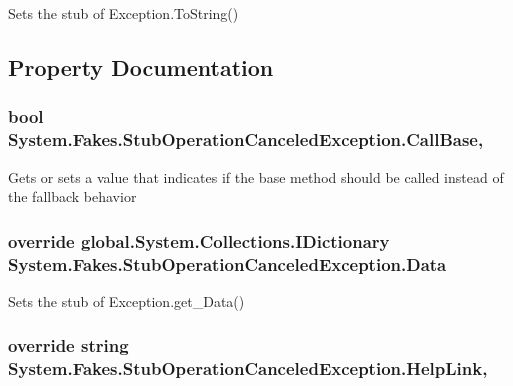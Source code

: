 Sets the stub of Exception.\-To\-String()



\subsection{Property Documentation}
\hypertarget{class_system_1_1_fakes_1_1_stub_operation_canceled_exception_a45fef801671c6864f8eb65a66c1a8fee}{
\subsubsection[{Call\-Base}]{\setlength{\rightskip}{0pt plus 5cm}bool System.\-Fakes.\-Stub\-Operation\-Canceled\-Exception.\-Call\-Base\hspace{0.3cm}{\ttfamily [get]}, {\ttfamily [set]}}}\label{class_system_1_1_fakes_1_1_stub_operation_canceled_exception_a45fef801671c6864f8eb65a66c1a8fee}


Gets or sets a value that indicates if the base method should be called instead of the fallback behavior

\hypertarget{class_system_1_1_fakes_1_1_stub_operation_canceled_exception_ac60eeb4c9ea6f68e30568ce9702715e3}{
\subsubsection[{Data}]{\setlength{\rightskip}{0pt plus 5cm}override global.\-System.\-Collections.\-I\-Dictionary System.\-Fakes.\-Stub\-Operation\-Canceled\-Exception.\-Data\hspace{0.3cm}{\ttfamily [get]}}}\label{class_system_1_1_fakes_1_1_stub_operation_canceled_exception_ac60eeb4c9ea6f68e30568ce9702715e3}


Sets the stub of Exception.\-get\-\_\-\-Data()

\hypertarget{class_system_1_1_fakes_1_1_stub_operation_canceled_exception_aff3a629ac57d115cd47107300ab7333c}{
\subsubsection[{Help\-Link}]{\setlength{\rightskip}{0pt plus 5cm}override string System.\-Fakes.\-Stub\-Operation\-Canceled\-Exception.\-Help\-Link\hspace{0.3cm}{\ttfamily [get]}, {\ttfamily [set]}}}\label{class_system_1_1_fakes_1_1_stub_operation_canceled_exception_aff3a629ac57d115cd47107300ab7333c}


